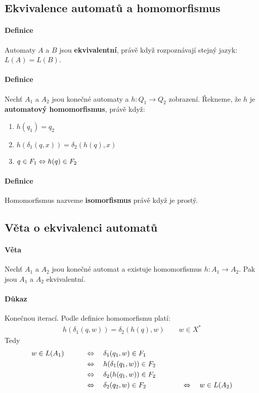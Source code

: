 \documentclass[a4paper,12pt,titlepage]{article}
\begin{document}
\subsection{Ekvivalence automatů a homomorfismus}
\setcounter{equation}{0}
\paragraph{Definice}
Automaty $A$ a $B$ jsou \textbf{ekvivalentní}, právě když rozpoznávají stejný jazyk: $L(A) =
L(B)$.
\paragraph{Definice}
Nechť $A_1$ a $A_2$ jsou konečné automaty a $h: Q_1 \to Q_2$ zobrazení. Řekneme, že 
$h$ je \textbf{automatový homomorfismus}, právě když:
\begin{enumerate}
	\item $h(q_1) = q_2$
	\item $h(\delta_1(q, x)) = \delta_2(h(q), x)$
	\item $q\in F_1 \Leftrightarrow h(q) \in F_2$
\end{enumerate}
\paragraph{Definice}
Homomorfismus nazveme \textbf{isomorfismus} právě když je prostý.
\subsection{Věta o ekvivalenci automatů}
\setcounter{equation}{0}
\paragraph{Věta}
Nechť $A_1$ a $A_2$ jsou konečné automat a existuje homomorfismus $h: A_1 \to
A_2$. Pak jsou $A_1$ a $A_2$ ekvivalentní.
\paragraph{Důkaz}
Konečnou iterací. Podle definice homomorfismu platí:
\begin{align}
	h(\delta_1(q, w)) = \delta_2(h(q), w) \qquad w \in X^*
\end{align}
Tedy
\begin{align}
	w \in L(A_1) \qquad & \quad\Leftrightarrow\quad \delta_1(q_1, w) \in F_1 \\
	& \quad\Leftrightarrow\quad h(\delta_1(q_1, w)) \in F_2 \\
	& \quad\Leftrightarrow\quad \delta_2(h(q_1, w)) \in F_2 \\
	& \quad\Leftrightarrow\quad \delta_2(q_2, w) \in F_2 \qquad \qquad \quad\Leftrightarrow\quad w \in L(A_2)
\end{align}
\end{document}
